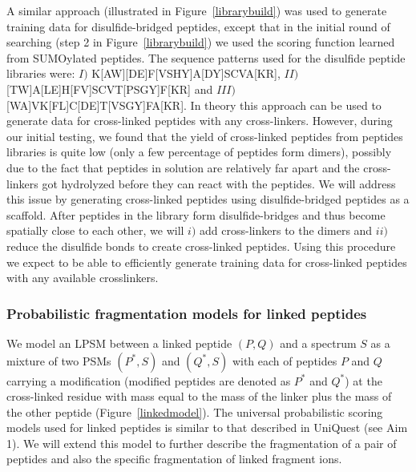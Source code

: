 A similar approach (illustrated in Figure~\ref{librarybuild})  was used to generate training data for disulfide-bridged peptides, except that in the initial round of searching (step 2 in Figure~\ref{librarybuild}) we used the scoring function learned from SUMOylated peptides. The sequence patterns used for the disulfide peptide libraries were: $I)$ \mbox{K[AW][DE]F[VSHY]A[DY]SCVA[KR]}, $II)$ \mbox{[TW]A[LE]H[FV]SCVT[PSGY]F[KR]} and
$III)$ \mbox{[WA]VK[FL]C[DE]T[VSGY]FA[KR]}. In theory this approach can be used to generate data for cross-linked peptides with any cross-linkers. However, during our initial testing, we found that the yield of cross-linked peptides from peptides libraries is quite low (only a few percentage of peptides form dimers), possibly due to the fact that peptides in solution are relatively far apart and the cross-linkers got hydrolyzed before they can react with the peptides.  We will address this issue by generating cross-linked peptides using disulfide-bridged peptides as a scaffold. After peptides in the library form disulfide-bridges and thus become spatially close to each other, we will $i)$ add cross-linkers to the dimers and $ii)$ reduce the disulfide bonds to create cross-linked peptides. Using this procedure we expect to be able to efficiently generate training data for cross-linked peptides with any available crosslinkers.


\subsubsection{ Probabilistic fragmentation models for linked peptides}

We model an LPSM between a linked peptide $(P,Q)$ and a spectrum $S$ as a mixture of two PSMs $(P^*,S)$ and $(Q^*,S)$ 
with each of peptides $P$ and $Q$ carrying a modification (modified peptides are denoted as $P^*$ and $Q^*$) 
at the cross-linked residue with mass equal to the mass of the linker plus the mass of the other peptide (Figure~\ref{linkedmodel}). 
The universal probabilistic scoring models used for linked peptides is similar to that described in UniQuest (see Aim 1).  We will extend this model to further describe the fragmentation of a pair of peptides and also the specific fragmentation of linked fragment ions. 

